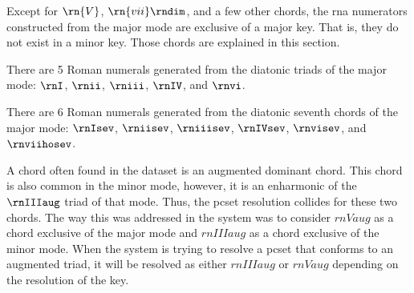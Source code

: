 
Except for $\rn{V}$, $\rn{vii}\rndim$, and a few other
chords, the \gls{rna} numerators constructed from the major
mode are exclusive of a major key. That is, they do not
exist in a minor key. Those chords are explained in this
section.


There are 5 Roman numerals generated from the diatonic
triads of the major mode: $\rnI$, $\rnii$, $\rniii$,
$\rnIV$, and $\rnvi$.



There are 6 Roman numerals generated from the diatonic
seventh chords of the major mode: $\rnIsev$, $\rniisev$,
$\rniiisev$, $\rnIVsev$, $\rnvisev$, and $\rnviihosev$.



A chord often found in the dataset is an augmented dominant
chord. This chord is also common in the minor mode, however,
it is an enharmonic of the $\rnIIIaug$ triad of that mode.
Thus, the \gls{pcset} resolution collides for these two
chords. The way this was addressed in the system was to
consider $rnVaug$ as a chord exclusive of the major mode and
$rnIIIaug$ as a chord exclusive of the minor mode. When the
system is trying to resolve a \gls{pcset} that conforms to
an augmented triad, it will be resolved as either $rnIIIaug$
or $rnVaug$ depending on the resolution of the key. 
